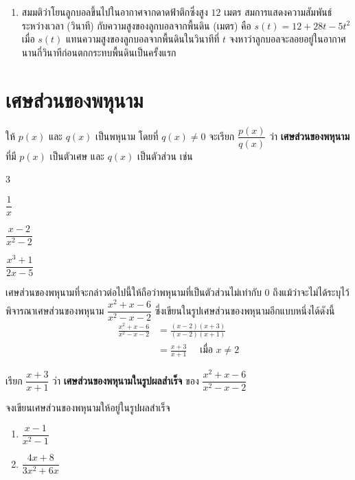 \begin{enumerate}[label=\arabic*., leftmargin=*, itemsep=0.5em]
	\item สมมติว่าโยนลูกบอลขึ้นไปในอากาศจากดาดฟ้าตึกซึ่งสูง $12$ เมตร สมการแสดงความสัมพันธ์ระหว่างเวลา (วินาที) กับความสูงของลูกบอลจากพื้นดิน (เมตร) คือ $s(t) = 12 + 28t - 5t^2$ เมื่อ $s(t)$ แทนความสูงของลูกบอลจากพื้นดินในวินาทีที่ $t$ จงหาว่าลูกบอลจะลอยอยู่ในอากาศนานกี่วินาทีก่อนตกกระทบพื้นดินเป็นครั้งแรก
\end{enumerate}


\newpage
\section{เศษส่วนของพหุนาม}
ให้ $p(x)$ และ $q(x)$ เป็นพหุนาม โดยที่ $q(x) \neq 0$ จะเรียก $\dfrac{p(x)}{q(x)}$ ว่า \textbf{เศษส่วนของพหุนาม} ที่มี $p(x)$ เป็นตัวเศษ และ $q(x)$ เป็นตัวส่วน เช่น
\begin{enumerate}[label=\arabic*., leftmargin=2.5em]
\begin{multicols}{3}
    \item $\dfrac{1}{x}$ 
    \item $\dfrac{x-2}{x^{2}-2}$
    \item $\dfrac{x^{3}+1}{2 x-5}$ 
\end{multicols}
\end{enumerate}

\remark เศษส่วนของพหุนามที่จะกล่าวต่อไปนี้ให้ถือว่าพหุนามที่เป็นตัวส่วนไม่เท่ากับ $0$ ถึงแม้ว่าจะไม่ได้ระบุไว้\\ 
พิจารณาเศษส่วนของพหุนาม $\dfrac{x^{2}+x-6}{x^{2}-x-2}$ ซึ่งเขียนในรูปเศษส่วนของพหุนามอีกแบบหนึ่งได้ดังนี้
 \begin{align*}
 \frac{x^{2}+x-6}{x^{2}-x-2} & =\frac{(x-2)(x+3)}{(x-2)(x+1)} \\
& =\frac{x+3}{x+1} \quad \text { เมื่อ } x \neq 2   
\end{align*}

เรียก $\dfrac{x+3}{x+1}$ ว่า \textbf{เศษส่วนของพหุนามในรูปผลสำเร็จ} ของ $\dfrac{x^{2}+x-6}{x^{2}-x-2}$   

\newpage
\begin{examplebox}
  จงเขียนเศษส่วนของพหุนามให้อยู่ในรูปผลสำเร็จ
 \begin{enumerate}[label=\arabic*), leftmargin=2.5em]
 \item 	$\dfrac{x-1}{x^2-1}$
 \item $\dfrac{4x+8}{3x^2+6x}$
 \end{enumerate}  
\end{examplebox}
\solution

\newpage
